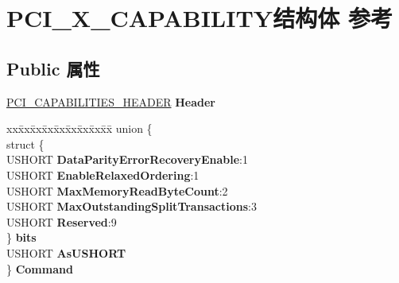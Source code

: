 \hypertarget{struct_p_c_i___x___c_a_p_a_b_i_l_i_t_y}{}\section{P\+C\+I\+\_\+\+X\+\_\+\+C\+A\+P\+A\+B\+I\+L\+I\+T\+Y结构体 参考}
\label{struct_p_c_i___x___c_a_p_a_b_i_l_i_t_y}
\subsection*{Public 属性}
\begin{DoxyCompactItemize}
\item 
\mbox{\label{struct_p_c_i___x___c_a_p_a_b_i_l_i_t_y_a2e64bd597fc8a2a5c8bb50704ef14e4a}} 
\hyperlink{struct___p_c_i___c_a_p_a_b_i_l_i_t_i_e_s___h_e_a_d_e_r}{P\+C\+I\+\_\+\+C\+A\+P\+A\+B\+I\+L\+I\+T\+I\+E\+S\+\_\+\+H\+E\+A\+D\+ER} {\bfseries Header}
\item 
\mbox{\label{struct_p_c_i___x___c_a_p_a_b_i_l_i_t_y_a8c0eda56c5efc9cbecff31b4a8d501de}} 
\begin{tabbing}
xx\=xx\=xx\=xx\=xx\=xx\=xx\=xx\=xx\=\kill
union \{\\
\>struct \{\\
\>\>USHORT {\bfseries DataParityErrorRecoveryEnable}:1\\
\>\>USHORT {\bfseries EnableRelaxedOrdering}:1\\
\>\>USHORT {\bfseries MaxMemoryReadByteCount}:2\\
\>\>USHORT {\bfseries MaxOutstandingSplitTransactions}:3\\
\>\>USHORT {\bfseries Reserved}:9\\
\>\} {\bfseries bits}\\
\>USHORT {\bfseries AsUSHORT}\\
\} {\bfseries Command}\\


\end{tabbing}
\end{DoxyCompactItemize}
